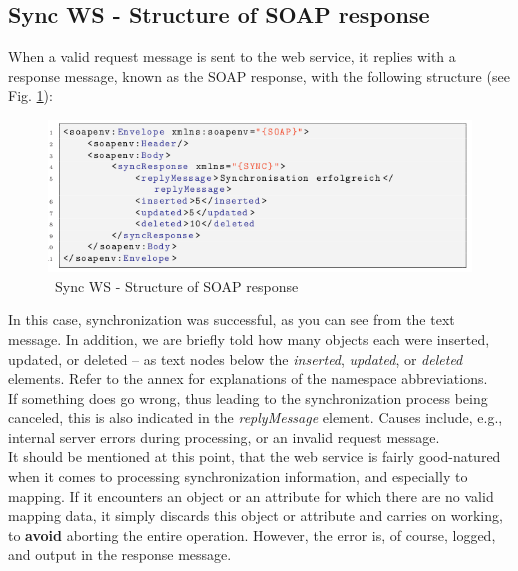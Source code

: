 \documentclass[a4paper,10pt]{book}
\begin{document}
\subsection{Sync WS - Structure of SOAP response}
When a valid request message is sent to the web service, it replies with a response message, known as the SOAP response,
with the following structure (see Fig. \ref{Sync WS - Structure of SOAP response}):
\newline
\begin{figure}[htb!]
  \centering
  \includegraphics[scale=.7]{Screenshot/SyncAPI_SOAP_Z1-11_soapenv-en.png}
  \caption{\label{Sync WS - Structure of SOAP response} \ Sync WS - Structure of SOAP response}
\end{figure}
\newline
In this case, synchronization was successful, as you can see from the text message. In addition, we are briefly told
how many objects each were inserted, updated, or deleted – as text nodes below the \textit{inserted},
\textit{updated}, or \textit{deleted} elements. Refer to the annex for explanations of the
namespace abbreviations.
\newline\\
If something does go wrong, thus leading to the synchronization process being canceled, this is also indicated in the
\textit{replyMessage} element. Causes include, e.g., internal server errors during processing, or an
invalid request message.
\newline\\
It should be mentioned at this point, that the web service is fairly good-natured when it comes to processing
synchronization information, and especially to mapping. If it encounters an object or an attribute for which
there are no valid mapping data, it simply discards this object or attribute and carries on working, to
\textbf{avoid} aborting the entire operation. However, the error is, of course, logged, and output in the response message.
\end{document}
